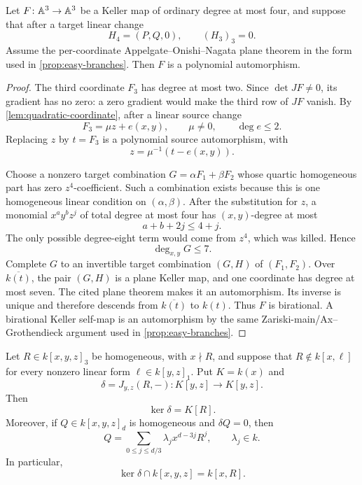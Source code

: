 
\begin{proposition}
\label{prop:quartic-r-zero-repair}
Let \(F\colon\AA^3\to\AA^3\) be a Keller map of ordinary degree at most
four, and suppose that after a target linear change
\[
 H_4=(P,Q,0),\qquad (H_3)_3=0.
\]
Assume the per-coordinate Appelgate--Onishi--Nagata plane theorem in the
form used in \cref{prop:easy-branches}.  Then \(F\) is a polynomial
automorphism.
\end{proposition}

\begin{proof}
The third coordinate \(F_3\) has degree at most two.  Since
\(\det JF\ne0\), its gradient has no zero: a zero gradient would make the
third row of \(JF\) vanish.  By \cref{lem:quadratic-coordinate}, after a
linear source change
\[
 F_3=\mu z+e(x,y),\qquad \mu\ne0,\qquad \deg e\le2.
\]
Replacing \(z\) by \(t=F_3\) is a polynomial source automorphism, with
\[
 z=\mu^{-1}(t-e(x,y)).
\]

Choose a nonzero target combination \(G=\alpha F_1+\beta F_2\) whose
quartic homogeneous part has zero \(z^4\)-coefficient.  Such a combination
exists because this is one homogeneous linear condition on
\((\alpha,\beta)\).  After the substitution for \(z\), a monomial
\(x^ay^bz^j\) of total degree at most four has \((x,y)\)-degree at most
\[
 a+b+2j\le4+j.
\]
The only possible degree-eight term would come from \(z^4\), which was
killed.  Hence
\[
 \deg_{x,y}G\le7.
\]
Complete \(G\) to an invertible target combination \((G,H)\) of
\((F_1,F_2)\).  Over \(\overline{k(t)}\), the pair \((G,H)\) is a plane
Keller map, and one coordinate has degree at most seven.  The cited plane
theorem makes it an automorphism.  Its inverse is unique and therefore
descends from \(\overline{k(t)}\) to \(k(t)\).  Thus \(F\) is birational.
A birational Keller self-map is an automorphism by the same
Zariski-main/Ax--Grothendieck argument used in \cref{prop:easy-branches}.
\end{proof}


\begin{lemma}
\label{lem:homogeneous-cubic-centralizer}
Let \(R\in k[x,y,z]_3\) be homogeneous, with \(x\nmid R\), and suppose that
\(R\notin k[x,\ell]\) for every nonzero linear form
\(\ell\in k[y,z]_1\).  Put \(K=k(x)\) and
\[
 \delta=J_{y,z}(R,-)\colon K[y,z]\longrightarrow K[y,z].
\]
Then
\[
 \ker\delta=K[R].
\]
Moreover, if \(Q\in k[x,y,z]_d\) is homogeneous and \(\delta Q=0\), then
\[
 Q=\sum_{0\le j\le d/3}\lambda_j x^{d-3j}R^j,
 \qquad \lambda_j\in k.
\]
In particular,
\[
 \ker\delta\cap k[x,y,z]=k[x,R].
\]
\end{lemma}


